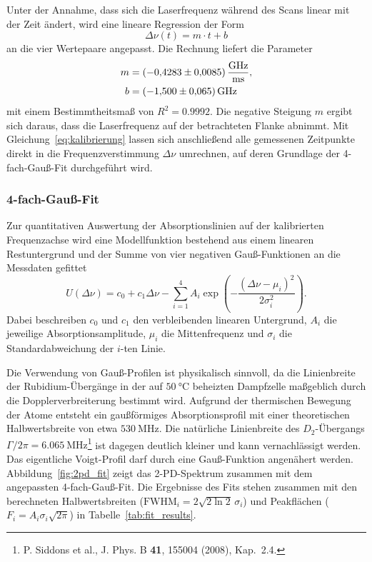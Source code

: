 Unter der Annahme, dass sich die Laserfrequenz während des Scans linear mit der Zeit ändert, wird eine lineare Regression der Form
\begin{equation}
    \Delta\nu(t) = m \cdot t + b
    \label{eq:kalibrierung}
\end{equation}
an die vier Wertepaare angepasst. Die Rechnung liefert die Parameter
\begin{align}
    m &= \SI{-0.4283 \pm 0.0085}{\giga\hertz\per\milli\second}, \\
    b &= \SI{-1.500 \pm 0.065}{\giga\hertz}
\end{align}
mit einem Bestimmtheitsmaß von $R^2 = \num{0.9992}$. Die negative Steigung $m$ ergibt sich daraus, dass die Laserfrequenz auf der betrachteten Flanke abnimmt. Mit Gleichung~\eqref{eq:kalibrierung} lassen sich anschließend alle gemessenen Zeitpunkte direkt in die Frequenzverstimmung $\Delta\nu$ umrechnen, auf deren Grundlage der 4-fach-Gauß-Fit durchgeführt wird.

\subsubsection{4-fach-Gauß-Fit}
Zur quantitativen Auswertung der Absorptionslinien auf der kalibrierten Frequenzachse wird eine Modellfunktion bestehend aus einem linearen Restuntergrund und der Summe von vier negativen Gauß-Funktionen an die Messdaten gefittet
\begin{equation*}
    U(\Delta\nu) = c_0 + c_1 \Delta\nu - \sum_{i=1}^{4} A_i \exp\!\left(-\frac{(\Delta\nu - \mu_i)^2}{2\sigma_i^2}\right).
    \label{eq:four_gauss}
\end{equation*}
Dabei beschreiben $c_0$ und $c_1$ den verbleibenden linearen Untergrund, $A_i$ die jeweilige Absorptionsamplitude, $\mu_i$ die Mittenfrequenz und $\sigma_i$ die Standardabweichung der $i$-ten Linie.

Die Verwendung von Gauß-Profilen ist physikalisch sinnvoll, da die Linienbreite der Rubidium-Übergänge in der auf $\SI{50}{\degreeCelsius}$ beheizten Dampfzelle maßgeblich durch die Dopplerverbreiterung bestimmt wird. Aufgrund der thermischen Bewegung der Atome entsteht ein gaußförmiges Absorptionsprofil mit einer theoretischen Halbwertsbreite von etwa $\SI{530}{\mega\hertz}$. Die natürliche Linienbreite des $D_2$-Übergangs $\Gamma / 2\pi = \SI{6.065}{\mega\hertz}$\footnote{P. Siddons et al., J. Phys. B \textbf{41}, 155004 (2008), Kap.~2.4.} ist dagegen deutlich kleiner und kann vernachlässigt werden. Das eigentliche Voigt-Profil darf durch eine Gauß-Funktion angenähert werden. 
Abbildung~\ref{fig:2pd_fit} zeigt das 2-PD-Spektrum zusammen mit dem angepassten 4-fach-Gauß-Fit. Die Ergebnisse des Fits stehen zusammen mit den berechneten Halbwertsbreiten ($\text{FWHM}_i = 2\sqrt{2\ln 2}\,\sigma_i$) und Peakflächen ($F_i = A_i \sigma_i \sqrt{2\pi}$) in Tabelle~\ref{tab:fit_results}.


